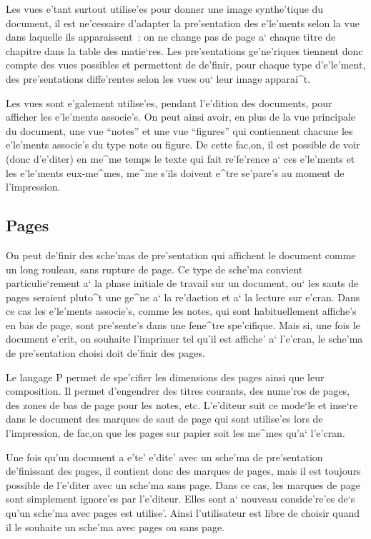 {Les vues e'tant surtout utilise'es pour donner une image synthe'tique du
document, il est ne'cessaire d'adapter la pre'sentation des e'le'ments
selon la vue dans laquelle ils apparaissent~: on ne change pas
de page a` chaque titre de chapitre dans la table des matie`res.
Les pre'sentations ge'ne'riques tiennent donc compte des vues possibles
et permettent de de'finir, pour chaque type d'e'le'ment, des pre'sentations
diffe'rentes selon les vues ou` leur image apparai^t.
\label{lesvues}

Les vues sont e'galement utilise'es, pendant l'e'dition des documents, pour
afficher les e'le'ments associe's. On peut ainsi avoir, en plus de la vue
principale du document, une vue ``notes'' et une vue ``figures'' qui
contiennent chacune les e'le'ments associe's du type note ou figure.
De cette fac,on, il est possible de voir (donc d'e'diter) en me^me temps
le texte qui fait re'fe'rence a` ces e'le'ments et les e'le'ments eux-me^mes,
me^me s'ils doivent e^tre se'pare's au moment de l'impression.

\subsection{Pages}

On peut de'finir des sche'mas de pre'sentation qui affichent le document
comme un long rouleau, sans rupture de page. Ce type de sche'ma convient
particulie`rement a` la phase initiale de travail sur un document, ou` les
sauts de pages seraient pluto^t une ge^ne a` la re'daction et a` la lecture
sur e'cran.
Dans ce cas les e'le'ments associe's, comme les notes, qui sont habituellement
affiche's en bas de page, sont pre'sente's dans une fene^tre spe'cifique.
Mais si, une fois le document e'crit, on souhaite l'imprimer tel qu'il est
affiche' a` l'e'cran, le sche'ma de pre'sentation choisi doit de'finir des
pages.

Le langage P permet de spe'cifier les dimensions des pages ainsi que leur
composition. Il permet d'engendrer des titres courants, des nume'ros
de pages, des zones de bas de page pour les notes, etc. L'e'diteur suit
ce mode`le et inse`re dans le document des marques de saut de page qui sont
utilise'es lors de l'impression, de fac,on que les pages sur papier soit
les me^mes qu'a` l'e'cran. 

Une fois qu'un document a e'te' e'dite' avec un sche'ma de pre'sentation
de'finissant des pages, il contient donc des marques de pages, mais il est
toujours possible de l'e'diter avec un sche'ma sans page. Dans ce cas, les
marques de page sont simplement ignore'es par l'e'diteur. Elles sont a` nouveau
conside're'es de`s qu'un sche'ma avec pages est utilise'. Ainsi l'utilisateur est
libre de choisir quand il le souhaite un sche'ma avec pages ou sans page.

}
